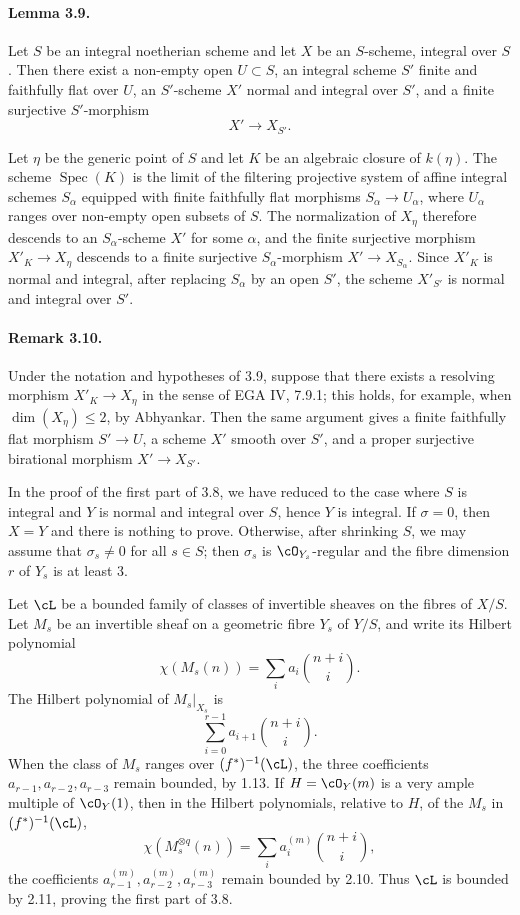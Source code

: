 \documentclass[11pt]{article}
\theoremstyle{plain}
\theoremstyle{definition}
\theoremstyle{remark}
\DeclareMathOperator{\Spec}{Spec}
\newcommand{\longto}{\longrightarrow}
\begin{document}
\paragraph{Lemma 3.9.}
Let $S$ be an integral noetherian scheme and let $X$ be an $S$-scheme, integral over $S$. Then there exist a non-empty open $U\subset S$, an integral scheme $S'$ finite and faithfully flat over $U$, an $S'$-scheme $X'$ normal and integral over $S'$, and a finite surjective $S'$-morphism
\[
X'\longto X_{S'}.
\]

Let $\eta$ be the generic point of $S$ and let $K$ be an algebraic closure of $k(\eta)$. The scheme $\Spec(K)$ is the limit of the filtering projective system of affine integral schemes $S_\alpha$ equipped with finite faithfully flat morphisms $S_\alpha\to U_\alpha$, where $U_\alpha$ ranges over non-empty open subsets of $S$. The normalization of $X_\eta$ therefore descends to an $S_\alpha$-scheme $X'$ for some $\alpha$, and the finite surjective morphism $X'_K\to X_\eta$ descends to a finite surjective $S_\alpha$-morphism $X'\to X_{S_\alpha}$. Since $X'_K$ is normal and integral, after replacing $S_\alpha$ by an open $S'$, the scheme $X'_{S'}$ is normal and integral over $S'$.

\paragraph{Remark 3.10.}
Under the notation and hypotheses of 3.9, suppose that there exists a resolving morphism $X'_K\to X_\eta$ in the sense of EGA IV, 7.9.1; this holds, for example, when $\dim(X_\eta)\leq 2$, by Abhyankar. Then the same argument gives a finite faithfully flat morphism $S'\to U$, a scheme $X'$ smooth over $S'$, and a proper surjective birational morphism $X'\to X_{S'}$.

In the proof of the first part of 3.8, we have reduced to the case where $S$ is integral and $Y$ is normal and integral over $S$, hence $Y$ is integral. If $\sigma=0$, then $X=Y$ and there is nothing to prove. Otherwise, after shrinking $S$, we may assume that $\sigma_s\neq 0$ for all $s\in S$; then $\sigma_s$ is $\cO_{Y_s}$-regular and the fibre dimension $r$ of $Y_s$ is at least $3$.

Let $\cL$ be a bounded family of classes of invertible sheaves on the fibres of $X/S$. Let $M_s$ be an invertible sheaf on a geometric fibre $Y_s$ of $Y/S$, and write its Hilbert polynomial
\[
\chi(M_s(n))=\sum_i a_i\binom{n+i}{i}.
\]
The Hilbert polynomial of $M_s|_{X_s}$ is
\[
\sum_{i=0}^{r-1}a_{i+1}\binom{n+i}{i}.
\]
When the class of $M_s$ ranges over $(f^*)^{-1}(\cL)$, the three coefficients $a_{r-1},a_{r-2},a_{r-3}$ remain bounded, by 1.13. If $H=\cO_Y(m)$ is a very ample multiple of $\cO_Y(1)$, then in the Hilbert polynomials, relative to $H$, of the $M_s$ in $(f^*)^{-1}(\cL)$,
\[
\chi(M_s^{\otimes q}(n))=\sum_i a_i^{(m)}\binom{n+i}{i},
\]
the coefficients $a^{(m)}_{r-1},a^{(m)}_{r-2},a^{(m)}_{r-3}$ remain bounded by 2.10. Thus $\cL$ is bounded by 2.11, proving the first part of 3.8.
\end{document}
